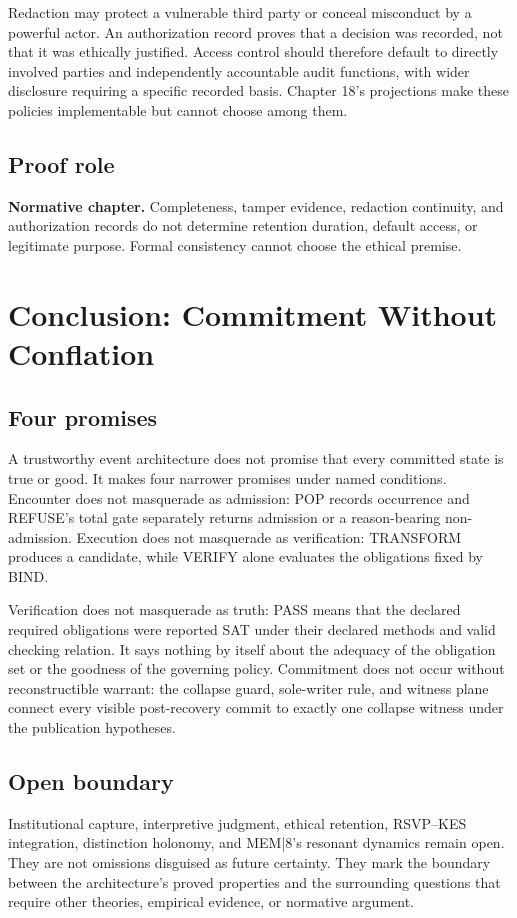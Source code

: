 \documentclass[11pt,openany]{book}
\begin{document}
Redaction may protect a vulnerable third party or conceal misconduct by a
powerful actor. An authorization record proves that a decision was recorded,
not that it was ethically justified. Access control should therefore default
to directly involved parties and independently accountable audit functions,
with wider disclosure requiring a specific recorded basis. Chapter 18's
projections make these policies implementable but cannot choose among them.

\section{Proof role}
\textbf{Normative chapter.} Completeness, tamper evidence, redaction continuity,
and authorization records do not determine retention duration, default access,
or legitimate purpose. Formal consistency cannot choose the ethical premise.

\chapter{Conclusion: Commitment Without Conflation}
\section{Four promises}
A trustworthy event architecture does not promise that every committed state
is true or good. It makes four narrower promises under named conditions.
Encounter does not masquerade as admission: POP records occurrence and
REFUSE's total gate separately returns admission or a reason-bearing
non-admission. Execution does not masquerade as verification: TRANSFORM
produces a candidate, while VERIFY alone evaluates the obligations fixed by
BIND.

Verification does not masquerade as truth: PASS means that the declared
required obligations were reported SAT under their declared methods and valid
checking relation. It says nothing by itself about the adequacy of the
obligation set or the goodness of the governing policy. Commitment does not
occur without reconstructible warrant: the collapse guard, sole-writer rule,
and witness plane connect every visible post-recovery commit to exactly one
collapse witness under the publication hypotheses.

\section{Open boundary}
Institutional capture, interpretive judgment, ethical retention, RSVP--KES
integration, distinction holonomy, and MEM|8's resonant dynamics remain open.
They are not omissions disguised as future certainty. They mark the boundary
between the architecture's proved properties and the surrounding questions
that require other theories, empirical evidence, or normative argument.
\end{document}
